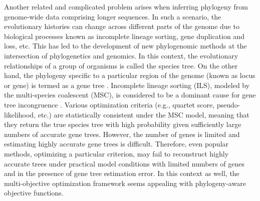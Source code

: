 Another related and complicated problem arises when inferring phylogeny from genome-wide data comprising longer sequences. In such a scenario, the evolutionary histories can change across different parts of the genome due to biological processes known as incomplete lineage sorting, gene duplication and loss, etc. This has led to the development of new phylogenomic methods at the intersection of phylogenetics and genomics. In this context, the evolutionary relationships of a group of organisms is called the species tree. On the other hand, the phylogeny specific to a particular region of the genome (known as locus or gene) is termed as a gene tree \cite{maddison1997gene}. Incomplete lineage sorting (ILS), modeled by the multi-species coalescent (MSC), is considered to be a dominant cause for gene tree incongruence \cite{mirarab2014evaluating, statistical-binning}. Various optimization criteria (e.g., quartet score, pseudo-likelihood, etc.) are statistically consistent under the MSC model, meaning that they return the true species tree with high probability given sufficiently large numbers of accurate gene trees. However, the number of genes is limited and estimating highly accurate gene trees is difficult. Therefore, even popular methods, optimizing a particular criterion, may fail to reconstruct highly accurate trees under practical model conditions with limited numbers of genes and in the presence of gene tree estimation error. In this context as well, the multi-objective optimization framework seems appealing with phylogeny-aware objective functions.


